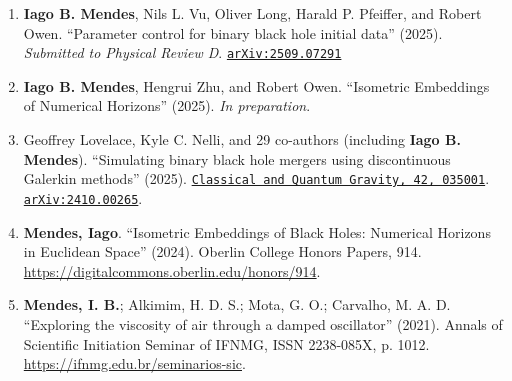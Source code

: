 \begin{enumerate} \setlength\itemsep{-0.1cm}
  \item {\bf Iago B. Mendes}, Nils L. Vu, Oliver Long, Harald P. Pfeiffer, and Robert Owen. ``Parameter control for binary black hole initial data'' (2025). {\em Submitted to Physical Review D}. \href{https://arxiv.org/abs/2509.07291}{{\tt arXiv:2509.07291}}
  \item {\bf Iago B. Mendes}, Hengrui Zhu, and Robert Owen. ``Isometric Embeddings of Numerical Horizons'' (2025). {\em In preparation}.
  \item Geoffrey Lovelace, Kyle C. Nelli, and 29 co-authors (including {\bf Iago B. Mendes}). ``Simulating binary black hole mergers using discontinuous Galerkin methods'' (2025). \href{https://doi.org/10.1088/1361-6382/ad9f19}{{\tt Classical and Quantum Gravity, 42, 035001}}. \href{https://arxiv.org/abs/2410.00265}{{\tt arXiv:2410.00265}}.
  \item {\bf Mendes, Iago}. “Isometric Embeddings of Black Holes: Numerical Horizons in Euclidean Space” (2024). Oberlin College Honors Papers, 914. \url{https://digitalcommons.oberlin.edu/honors/914}.
  \item {\bf Mendes, I. B.}; Alkimim, H. D. S.; Mota, G. O.; Carvalho, M. A. D. ``Exploring the viscosity of air through a damped oscillator'' (2021). Annals of Scientific Initiation Seminar of IFNMG, ISSN 2238-085X, p. 1012. \url{https://ifnmg.edu.br/seminarios-sic}.
\end{enumerate}
